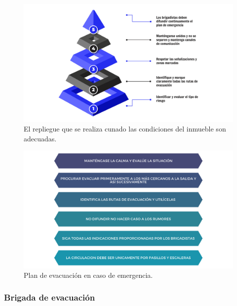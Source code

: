     
    \begin{figure}[H]
        \centering
        \includegraphics[trim = {60mm 10mm 60mm 10mm},clip,scale=0.22]{22/Img/repliegue.pdf}
        \caption{El repliegue que se realiza cunado las condiciones del inmueble son adecuadas.}
        \label{fig:planDeRepliege}
    \end{figure}
    
    
    
    \begin{figure}[H]
        \centering
        \includegraphics[trim = {60mm 10mm 60mm 10mm},clip,scale=0.2]{22/Img/evacuacion.pdf}
        \caption{Plan de evacuación en caso de emergencia.}
        \label{fig:planDeEvacuacion}
    \end{figure}
    
    \subsubsection{Brigada de evacuación}
    
    
